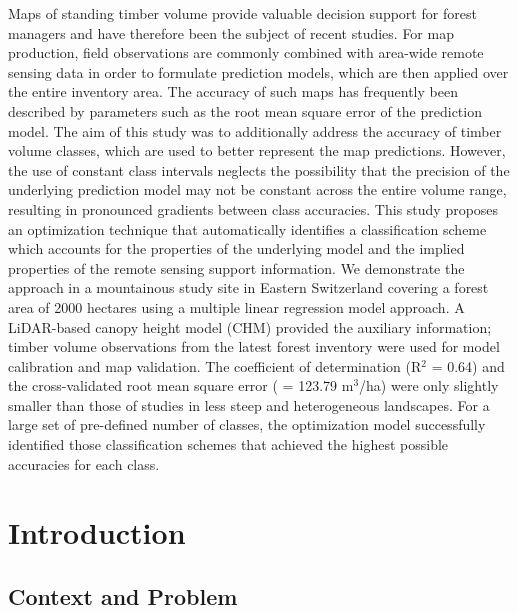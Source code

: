 Maps of standing timber volume provide valuable decision support for forest managers and have therefore been the subject of recent studies. For map production, field observations are commonly combined with area-wide remote sensing data in order to formulate prediction models, which are then applied over the entire inventory area. The accuracy of such maps has frequently been described by parameters such as the root mean square error of the prediction model. The aim of this study was to additionally address the accuracy of timber volume classes, which are used to better represent the map predictions. However, the use of constant class intervals neglects the possibility that the precision of the underlying prediction model may not be constant across the entire volume range, resulting in pronounced gradients between class accuracies. This study proposes an optimization technique that automatically identifies a classification scheme which accounts for the properties of the underlying model and the implied properties of the remote sensing support information. We demonstrate the approach in a mountainous study site in Eastern Switzerland covering a forest area of 2000 hectares using a multiple linear regression model approach. A LiDAR-based canopy height model (CHM) provided the auxiliary information; timber volume observations from the latest forest inventory were used for model calibration and map validation. The coefficient of determination (R$^2$ = 0.64) and the cross-validated root mean square error (\rmsecv{} = 123.79 m$^3$/ha) were only slightly smaller than those of studies in less steep and heterogeneous landscapes. For a large set of pre-defined number of classes, the optimization model successfully identified those classification schemes that achieved the highest possible accuracies for each class.



\section{Introduction} %
\label{sec:intro}

\subsection{Context and Problem}
\label{sec:co_and_prob}

